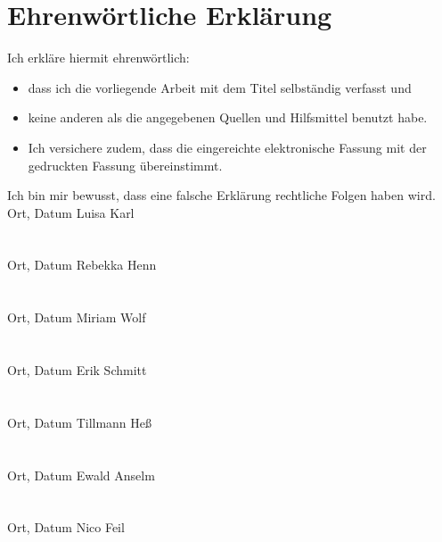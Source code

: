\clearpage
\chapter*{Ehrenwörtliche Erklärung}	



Ich erkläre hiermit ehrenwörtlich: 

\begin{itemize}
	\item dass ich die vorliegende Arbeit mit dem Titel \textit{\DerTitelDerArbeit} selbständig verfasst und
	\item keine anderen als die angegebenen Quellen und Hilfsmittel benutzt habe. 
	\item Ich versichere zudem, dass die eingereichte elektronische Fassung mit der gedruckten Fassung übereinstimmt.
\end{itemize}
Ich bin mir bewusst, dass eine falsche Erklärung rechtliche Folgen haben wird.
\vspace{1cm}
\\
Ort, Datum \hfill Luisa Karl
\\
\\
\\
Ort, Datum \hfill Rebekka Henn
\\
\\
\\
Ort, Datum \hfill Miriam Wolf
\\
\\
\\
Ort, Datum \hfill Erik Schmitt
\\
\\
\\
Ort, Datum \hfill Tillmann Heß
\\
\\
\\
Ort, Datum \hfill Ewald Anselm
\\
\\
\\
Ort, Datum \hfill Nico Feil
 